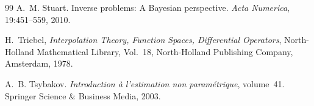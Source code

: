 \documentclass{article}
\numberwithin{equation}{section}
\theoremstyle{definition}
\begin{document}
\begin{thebibliography}{99}
A.~M. Stuart.
\newblock Inverse problems: A Bayesian perspective.
\newblock \emph{Acta Numerica}, 19:451--559, 2010.

H.~Triebel,
\emph{Interpolation Theory, Function Spaces, Differential Operators},
North-Holland Mathematical Library, Vol.~18,
North-Holland Publishing Company, Amsterdam, 1978.

A.~B. Tsybakov.
\newblock \emph{Introduction \`a l'estimation non param\'etrique}, volume~41.
\newblock Springer Science \& Business Media, 2003.

\end{thebibliography}
\end{document}
